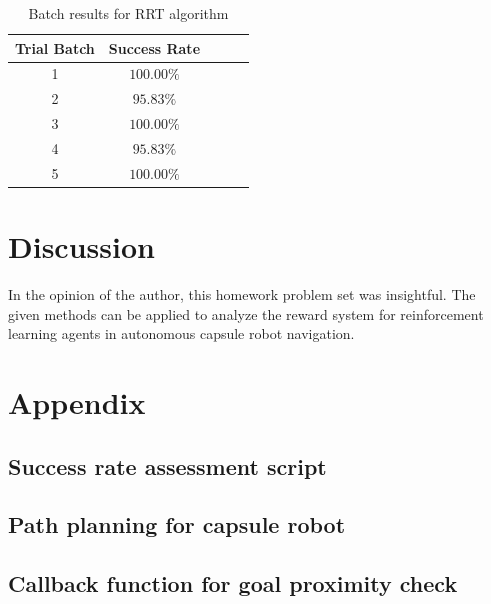 \documentclass[conference]{IEEEtran}
\begin{document}
\begin{table}[h!]
    \begin{center}
        \begin{tabular}{||c|c|c|c|c||}
        \hline
        Trial Batch & Success Rate \\
        \hline\hline
        1 & $100.00\%$ \\
        2 & $95.83\%$  \\
        3 & $100.00\%$ \\
        4 & $95.83\%$ \\
        5 & $100.00\%$ \\
        \hline
        \end{tabular}
    \end{center}
    \caption{Batch results for RRT algorithm}
    \label{rrt-batch-table}
\end{table}

\section{Discussion}
In the opinion of the author, this homework problem set was insightful. The given methods
can be applied to analyze the reward system for reinforcement learning agents in autonomous
capsule robot navigation.

\section{Appendix}

\subsection{Success rate assessment script}



\subsection{Path planning for capsule robot}



\subsection{Callback function for goal proximity check}





\end{document}

